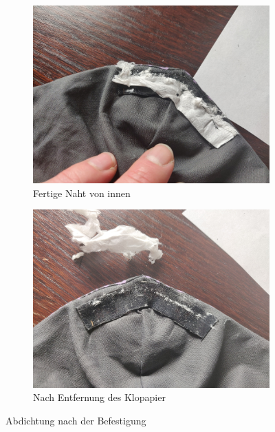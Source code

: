\documentclass[12pt,parskip=full]{scrartcl}
\begin{document}
\begin{figure}[ht]
    \vspace{0.5cm}
    \centering
    \begin{subfigure}{0.48\textwidth}
        \centering
        \includegraphics[width = \linewidth]{Pictures/09_NoseParts/NoseParts09_resized.jpg}
        \caption{Fertige Naht von innen}
        \label{Nose09}
    \end{subfigure}
    \begin{subfigure}{0.48\textwidth}
        \centering
        \includegraphics[width = \linewidth]{Pictures/09_NoseParts/NoseParts10_resized.jpg}
        \caption{Nach Entfernung des Klopapier}
        \label{Nose10}
    \end{subfigure}
    \caption{Abdichtung nach der Befestigung}
    \label{NoseRes}
\end{figure}
\end{document}

